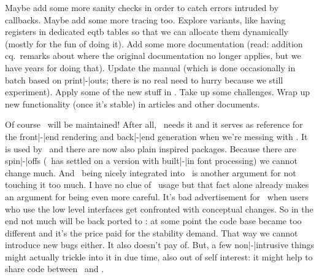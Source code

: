 \stopitemize

\starttitle[title=Todo]

\startitemize

\startitem
    Maybe add some more sanity checks in order to catch errors intruded by
    callbacks. Maybe add some more tracing too.
\stopitem
\startitem
    Explore variants, like having registers in dedicated eqtb tables so that we
    can allocate them dynamically (mostly for the fun of doing it).
\stopitem
\startitem
    Add some more documentation (read: addition cq.\ remarks about where the
    original documentation no longer applies, but we have years for doing that).
\stopitem
\startitem
    Update the manual (which is done occasionally in batch based on print|-|outs;
    there is no real need to hurry because we still experiment).
\stopitem
\startitem
    Apply some of the new stuff in \LMTX. Take up some challenges.
\stopitem
\startitem
    Wrap up new functionality (once it's stable) in articles and other documents.
\stopitem

\stopitemize

\stoptitle

\starttitle[title=And \LUATEX ?]

\startitemize

\startitem
    Of course \LUATEX\ will be maintained! After all, \MKIV\ needs it and it
    serves as reference for the front|-|end rendering and back|-|end generation
    when we're messing with \LUAMETATEX.
\stopitem
\startitem
    It is used by \LATEX\ and there are now also plain inspired packages. Because
    there are spin|-|offs (\LATEX\ has settled on a version with built|-|in font
    processing) we cannot change much.
\stopitem
\startitem
    And \LUATEX\ being nicely integrated into \TEXLIVE\ is another argument for
    not touching it too much.
\stopitem
\startitem
    I have no clue of \LUATEX\ usage but that fact alone already makes an
    argument for being even more careful. It's bad advertisement for \TEX\ when
    users who use the low level interfaces get confronted with conceptual
    changes.
\stopitem
\startitem
    So in the end not much will be back ported to \LUATEX: at some point the code
    base became too different and it's the price paid for the stability demand.
    That way we cannot introduce new bugs either. It also doesn't pay of.
\stopitem
\startitem
    But, a few non|-|intrusive things might actually trickle into it in due time,
    also out of self interest: it might help to share code between \MKIV\ and
    \LMTX.
\stopitem

\stopitemize

\stoptitle

\stopdocument
